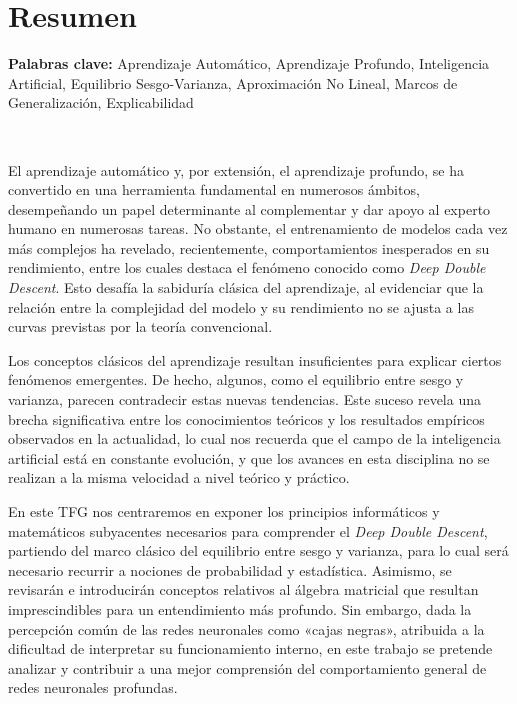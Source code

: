 %

\chapter{Resumen}

\noindent\textbf{Palabras clave:} Aprendizaje Automático, Aprendizaje Profundo, Inteligencia Artificial, Equilibrio Sesgo-Varianza, Aproximación No Lineal, Marcos de Generalización, Explicabilidad

\

El aprendizaje automático y, por extensión, el aprendizaje profundo, se ha convertido en una herramienta fundamental en numerosos ámbitos, desempeñando un papel determinante al complementar y dar apoyo al experto humano en numerosas tareas. No obstante, el entrenamiento de modelos cada vez más complejos ha revelado, recientemente, comportamientos inesperados en su rendimiento, entre los cuales destaca el fenómeno conocido como \emph{Deep Double Descent}. Esto desafía la sabiduría clásica del aprendizaje, al evidenciar que la relación entre la complejidad del modelo y su rendimiento no se ajusta a las curvas previstas por la teoría convencional.

Los conceptos clásicos del aprendizaje resultan insuficientes para explicar ciertos fenómenos emergentes. De hecho, algunos, como el equilibrio entre sesgo y varianza, parecen contradecir estas nuevas tendencias. Este suceso revela una brecha significativa entre los conocimientos teóricos y los resultados empíricos observados en la actualidad, lo cual nos recuerda que el campo de la inteligencia artificial está en constante evolución, y que los avances en esta disciplina no se realizan a la misma velocidad a nivel teórico y práctico.

En este TFG nos centraremos en exponer los principios informáticos y matemáticos subyacentes necesarios para comprender el \emph{Deep Double Descent}, partiendo del marco clásico del equilibrio entre sesgo y varianza, para lo cual será necesario recurrir a nociones de probabilidad y estadística. Asimismo, se revisarán e introducirán conceptos relativos al álgebra matricial que resultan imprescindibles para un entendimiento más profundo. Sin embargo, dada la percepción común de las redes neuronales como «cajas negras», atribuida a la dificultad de interpretar su funcionamiento interno, en este trabajo se pretende analizar y contribuir a una mejor comprensión del comportamiento general de redes neuronales profundas.

